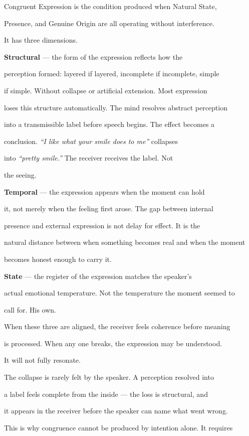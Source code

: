 \documentclass[12pt, a4paper]{article}
\begin{document}
Congruent Expression is the condition produced when Natural State,

Presence, and Genuine Origin are all operating without interference.

It has three dimensions.

\textbf{Structural} --- the form of the expression reflects how the

perception formed: layered if layered, incomplete if incomplete, simple

if simple. Without collapse or artificial extension. Most expression

loses this structure automatically. The mind resolves abstract perception

into a transmissible label before speech begins. The effect becomes a

conclusion. \textit{``I like what your smile does to me''} collapses

into \textit{``pretty smile.''} The receiver receives the label. Not

the seeing.

\textbf{Temporal} --- the expression appears when the moment can hold

it, not merely when the feeling first arose. The gap between internal

presence and external expression is not delay for effect. It is the

natural distance between when something becomes real and when the moment

becomes honest enough to carry it.

\textbf{State} --- the register of the expression matches the speaker's

actual emotional temperature. Not the temperature the moment seemed to

call for. His own.

When these three are aligned, the receiver feels coherence before meaning

is processed. When any one breaks, the expression may be understood.

It will not fully resonate.

The collapse is rarely felt by the speaker. A perception resolved into

a label feels complete from the inside --- the loss is structural, and

it appears in the receiver before the speaker can name what went wrong.

This is why congruence cannot be produced by intention alone. It requires
\end{document}

